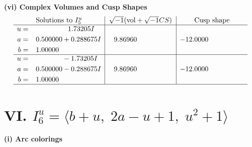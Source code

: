 \documentclass[1p]{elsarticle_modified}
\theoremstyle{definition}
\newcommand{\I}{\sqrt{-1}}
\begin{document}
\newpage\flushleft \textbf{(vi) Complex Volumes and Cusp Shapes}
$$\begin{array}{c|c|c}  
\text{Solutions to }I^u_{5}& \I (\text{vol} + \sqrt{-1}CS) & \text{Cusp shape}\\
 \hline 
\begin{aligned}
u &= \phantom{-0.000000 -}1.73205 I \\
a &= \phantom{-}0.500000 + 0.288675 I \\
b &= \phantom{-}1.00000\phantom{ +0.000000I}\end{aligned}
 & \phantom{-}9.86960\phantom{ +0.000000I} & -12.0000\phantom{ +0.000000I} \\ \hline\begin{aligned}
u &= \phantom{-0.000000 } -1.73205 I \\
a &= \phantom{-}0.500000 - 0.288675 I \\
b &= \phantom{-}1.00000\phantom{ +0.000000I}\end{aligned}
 & \phantom{-}9.86960\phantom{ +0.000000I} & -12.0000\phantom{ +0.000000I}\\
 \hline 
 \end{array}$$\newpage\newpage\renewcommand{\arraystretch}{1}
\centering \section*{VI. $I^u_{6}= \langle b+u,\;2 a- u+1,\;u^2+1 \rangle$}
\flushleft \textbf{(i) Arc colorings}\\
\end{document}

